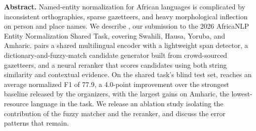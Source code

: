 \documentclass[10pt,twocolumn]{article}
\begin{document}
{\begin{center}
\begin{minipage}{0.92\textwidth}
\small
\textbf{Abstract.} Named-entity normalization for African languages is
complicated by inconsistent orthographies, sparse gazetteers, and heavy
morphological inflection on person and place names. We describe
, our submission to the 2026 AfricaNLP Entity Normalization
Shared Task, covering Swahili, Hausa, Yoruba, and Amharic. 
pairs a shared multilingual encoder with a lightweight span detector, a
dictionary-and-fuzzy-match candidate generator built from crowd-sourced
gazetteers, and a neural reranker that scores candidates using both string
similarity and contextual evidence. On the shared task's blind test set,
 reaches an average normalized F1 of 77.9, a 4.0-point
improvement over the strongest baseline released by the organizers, with the
largest gains on Amharic, the lowest-resource language in the task. We
release an ablation study isolating the contribution of the fuzzy matcher
and the reranker, and discuss the error patterns that remain.
\end{minipage}
\end{center}
\vspace{1.1em}
}

\twocolumn[\PaperTitleBlock]










\end{document}
